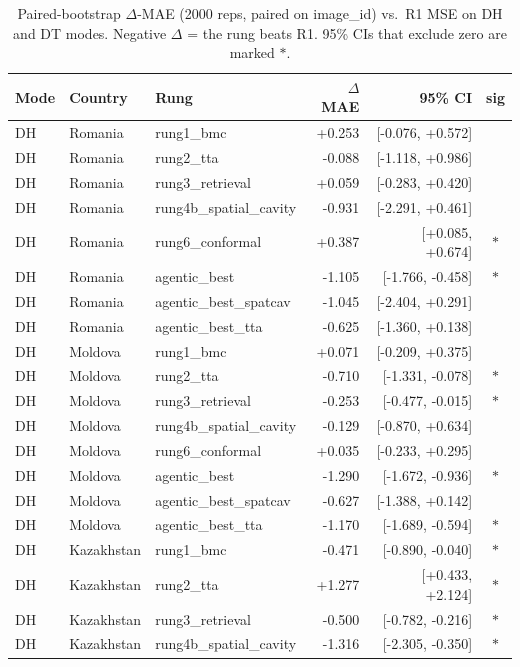 \begin{table}[t]
\centering\small
\caption{Paired-bootstrap $\Delta$-MAE (2000 reps, paired on image\_id) vs.\ R1 MSE on DH and DT modes. Negative $\Delta$ = the rung beats R1. 95\% CIs that exclude zero are marked $\ast$.}
\label{tab:bootstrap}
\setlength{\tabcolsep}{4pt}
\begin{tabular}{l l l r r c}
\toprule
Mode & Country & Rung & $\Delta$MAE & 95\% CI & sig \\
\midrule
DH & Romania & rung1\_bmc & +0.253 & [-0.076, +0.572] &  \\
DH & Romania & rung2\_tta & -0.088 & [-1.118, +0.986] &  \\
DH & Romania & rung3\_retrieval & +0.059 & [-0.283, +0.420] &  \\
DH & Romania & rung4b\_spatial\_cavity & -0.931 & [-2.291, +0.461] &  \\
DH & Romania & rung6\_conformal & +0.387 & [+0.085, +0.674] & $\ast$ \\
DH & Romania & agentic\_best & -1.105 & [-1.766, -0.458] & $\ast$ \\
DH & Romania & agentic\_best\_spatcav & -1.045 & [-2.404, +0.291] &  \\
DH & Romania & agentic\_best\_tta & -0.625 & [-1.360, +0.138] &  \\
DH & Moldova & rung1\_bmc & +0.071 & [-0.209, +0.375] &  \\
DH & Moldova & rung2\_tta & -0.710 & [-1.331, -0.078] & $\ast$ \\
DH & Moldova & rung3\_retrieval & -0.253 & [-0.477, -0.015] & $\ast$ \\
DH & Moldova & rung4b\_spatial\_cavity & -0.129 & [-0.870, +0.634] &  \\
DH & Moldova & rung6\_conformal & +0.035 & [-0.233, +0.295] &  \\
DH & Moldova & agentic\_best & -1.290 & [-1.672, -0.936] & $\ast$ \\
DH & Moldova & agentic\_best\_spatcav & -0.627 & [-1.388, +0.142] &  \\
DH & Moldova & agentic\_best\_tta & -1.170 & [-1.689, -0.594] & $\ast$ \\
DH & Kazakhstan & rung1\_bmc & -0.471 & [-0.890, -0.040] & $\ast$ \\
DH & Kazakhstan & rung2\_tta & +1.277 & [+0.433, +2.124] & $\ast$ \\
DH & Kazakhstan & rung3\_retrieval & -0.500 & [-0.782, -0.216] & $\ast$ \\
DH & Kazakhstan & rung4b\_spatial\_cavity & -1.316 & [-2.305, -0.350] & $\ast$ \\

\end{tabular}
\end{table}
